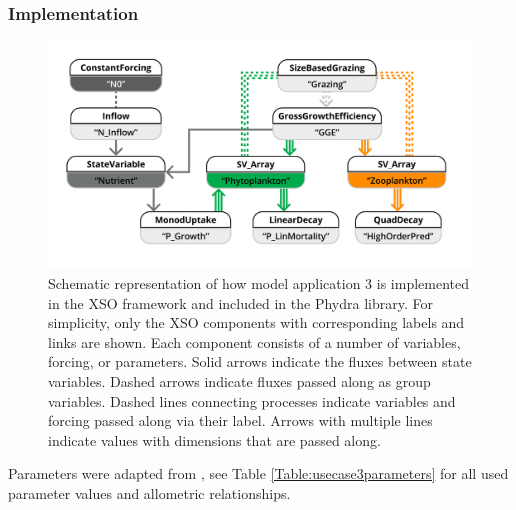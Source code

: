 \documentclass[gmd, manuscript]{copernicus}
\begin{document}
\subsubsection{Implementation}
\begin{figure}[t]
\includegraphics[width=15cm]{Figures/firstdraft_schematics/code_schematics/ASTroCAT.pdf}
\caption{Schematic representation of how model application 3 is implemented in the XSO framework and included in the Phydra library. For simplicity, only the XSO components with corresponding labels and links are shown. Each component consists of a number of variables, forcing, or parameters. Solid arrows indicate the fluxes between state variables. Dashed arrows indicate fluxes passed along as group variables. Dashed lines connecting processes indicate variables and forcing passed along via their label. Arrows with multiple lines indicate values with dimensions that are passed along.}
\label{Figure:CodeSchematics_3}
\end{figure}


Parameters were adapted from \citet{Banas2011b}, see Table \ref{Table:usecase3parameters} for all used parameter values and allometric relationships.
\end{document}

